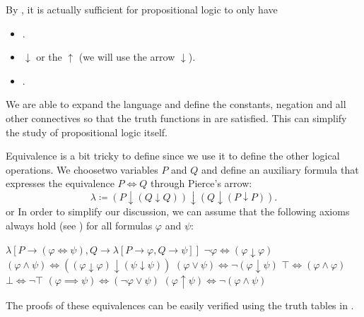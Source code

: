 \begin{remark}\label{remark:minimal_propositional_language}
  By , it is actually sufficient for propositional logic to only have
  \begin{itemize}
    \item {}.
    \item {} \( \downarrow \) or the  \( \uparrow \) (we will use the arrow \( \downarrow \)).
    \item {}.
  \end{itemize}

  We are able to expand the language and define the constants, negation and all other connectives so that the truth functions in  are satisfied. This can simplify the study of propositional logic itself.

  Equivalence is a bit tricky to define since we use it to define the other logical operations. We choose\AOC two variables \( P \) and \( Q \) and define an auxiliary formula that expresses the equivalence \( P \iff Q \) through Pierce's arrow:
  \begin{equation*}
    \lambda \coloneqq (P \downarrow (Q \downarrow Q)) \downarrow (Q \downarrow (P \downarrow P)).
  \end{equation*}
 or 
  In order to simplify our discussion, we can assume that the following axioms always hold (see ) for all formulas \( \varphi \) and \( \psi \):
  \begin{description}
     \( \lambda[P \to (\varphi \iff \psi), Q \to \lambda[P \to \varphi, Q \to \psi]] \)
     \( \neg \varphi \iff (\varphi \downarrow \varphi) \)
     \( (\varphi \land \psi) \iff ((\varphi \downarrow \varphi) \downarrow (\psi \downarrow \psi)) \)
     \( (\varphi \lor \psi) \iff \neg (\varphi \downarrow \psi) \)
     \( \top \iff (\varphi \land \varphi) \)
     \( \bot \iff \neg \top \)
     \( (\varphi \implies \psi) \iff (\neg \varphi \lor \psi) \)
     \( (\varphi \uparrow \psi) \iff \neg (\varphi \land \psi) \)
  \end{description}

  The proofs of these equivalences can be easily verified using the truth tables in .
\end{remark}

